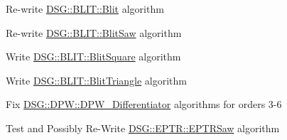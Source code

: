 
\begin{DoxyRefList}
\item[\label{todo__todo000001}%
\hypertarget{todo__todo000001}{}%
Class \hyperlink{class_d_s_g_1_1_b_l_i_t_1_1_blit}{D\+S\+G\+:\+:B\+L\+I\+T\+:\+:Blit} ]Re-\/write \hyperlink{class_d_s_g_1_1_b_l_i_t_1_1_blit}{D\+S\+G\+::\+B\+L\+I\+T\+::\+Blit} algorithm  
\item[\label{todo__todo000002}%
\hypertarget{todo__todo000002}{}%
Class \hyperlink{class_d_s_g_1_1_b_l_i_t_1_1_blit_saw}{D\+S\+G\+:\+:B\+L\+I\+T\+:\+:Blit\+Saw} ]Re-\/write \hyperlink{class_d_s_g_1_1_b_l_i_t_1_1_blit_saw}{D\+S\+G\+::\+B\+L\+I\+T\+::\+Blit\+Saw} algorithm  
\item[\label{todo__todo000003}%
\hypertarget{todo__todo000003}{}%
Class \hyperlink{class_d_s_g_1_1_b_l_i_t_1_1_blit_square}{D\+S\+G\+:\+:B\+L\+I\+T\+:\+:Blit\+Square} ]Write \hyperlink{class_d_s_g_1_1_b_l_i_t_1_1_blit_square}{D\+S\+G\+::\+B\+L\+I\+T\+::\+Blit\+Square} algorithm  
\item[\label{todo__todo000004}%
\hypertarget{todo__todo000004}{}%
Class \hyperlink{class_d_s_g_1_1_b_l_i_t_1_1_blit_triangle}{D\+S\+G\+:\+:B\+L\+I\+T\+:\+:Blit\+Triangle} ]Write \hyperlink{class_d_s_g_1_1_b_l_i_t_1_1_blit_triangle}{D\+S\+G\+::\+B\+L\+I\+T\+::\+Blit\+Triangle} algorithm  
\item[\label{todo__todo000005}%
\hypertarget{todo__todo000005}{}%
Class \hyperlink{class_d_s_g_1_1_d_p_w_1_1_d_p_w___differentiator}{D\+S\+G\+:\+:D\+P\+W\+:\+:D\+P\+W\+\_\+\+Differentiator$<$ order $>$} ]Fix \hyperlink{class_d_s_g_1_1_d_p_w_1_1_d_p_w___differentiator}{D\+S\+G\+::\+D\+P\+W\+::\+D\+P\+W\+\_\+\+Differentiator} algorithms for orders 3-\/6  
\item[\label{todo__todo000006}%
\hypertarget{todo__todo000006}{}%
Class \hyperlink{class_d_s_g_1_1_e_p_t_r_1_1_e_p_t_r_saw}{D\+S\+G\+:\+:E\+P\+T\+R\+:\+:E\+P\+T\+R\+Saw} ]Test and Possibly Re-\/\+Write \hyperlink{class_d_s_g_1_1_e_p_t_r_1_1_e_p_t_r_saw}{D\+S\+G\+::\+E\+P\+T\+R\+::\+E\+P\+T\+R\+Saw} algorithm 
\end{DoxyRefList}